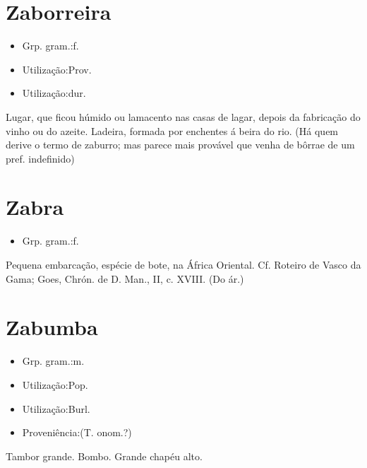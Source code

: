 \section{Zaborreira}
\begin{itemize}
\item {Grp. gram.:f.}
\end{itemize}
\begin{itemize}
\item {Utilização:Prov.}
\end{itemize}
\begin{itemize}
\item {Utilização:dur.}
\end{itemize}
Lugar, que ficou húmido ou lamacento nas casas de lagar, depois da fabricação do vinho ou do azeite.
Ladeira, formada por enchentes á beira do rio.
(Há quem derive o termo de \textunderscore zaburro\textunderscore ; mas parece mais provável que venha de \textunderscore bôrra\textunderscore  e de um pref. indefinido)
\section{Zabra}
\begin{itemize}
\item {Grp. gram.:f.}
\end{itemize}
Pequena embarcação, espécie de bote, na África Oriental. Cf. \textunderscore Roteiro de Vasco da Gama\textunderscore ; Goes, \textunderscore Chrón. de D. Man.\textunderscore , II, c. XVIII.
(Do ár.)
\section{Zabumba}
\begin{itemize}
\item {Grp. gram.:m.}
\end{itemize}
\begin{itemize}
\item {Utilização:Pop.}
\end{itemize}
\begin{itemize}
\item {Utilização:Burl.}
\end{itemize}
\begin{itemize}
\item {Proveniência:(T. onom.?)}
\end{itemize}
Tambor grande.
Bombo.
Grande chapéu alto.
